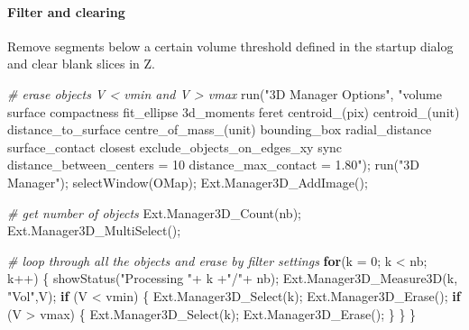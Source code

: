 \documentclass[10pt, b5paper, singlespacinge, twoside]{reedthesis} %
\newenvironment{Shaded}{}{}
\newcommand{\AttributeTok}[1]{#1}
\newcommand{\CommentTok}[1]{\textit{#1}}
\newcommand{\ControlFlowTok}[1]{\textbf{#1}}
\newcommand{\DecValTok}[1]{#1}
\newcommand{\FunctionTok}[1]{#1}
\newcommand{\NormalTok}[1]{#1}
\newcommand{\SpecialCharTok}[1]{#1}
\newcommand{\StringTok}[1]{#1}
\theoremstyle{definition}
\theoremstyle{definition}
\theoremstyle{definition}
\theoremstyle{remark}
\begin{document}
\hypertarget{filter-and-clearing}{%
\paragraph{Filter and clearing}\label{filter-and-clearing}}

Remove segments below a certain volume threshold defined in the startup dialog and clear blank slices in Z.

\scriptsize
\begin{Shaded}
\begin{Highlighting}[numbers=left,,]
\CommentTok{\# erase objects V \textless{} vmin and V \textgreater{} vmax}
  \FunctionTok{run}\NormalTok{(}\StringTok{"3D Manager Options"}\NormalTok{, }\StringTok{"volume surface compactness fit\_ellipse 3d\_moments }
\StringTok{      feret centroid\_(pix) centroid\_(unit) distance\_to\_surface centre\_of\_mass\_(unit) }
\StringTok{      bounding\_box radial\_distance surface\_contact closest exclude\_objects\_on\_edges\_xy }
\StringTok{      sync distance\_between\_centers = 10 distance\_max\_contact = 1.80"}\NormalTok{);}
    \FunctionTok{run}\NormalTok{(}\StringTok{"3D Manager"}\NormalTok{);}
  \FunctionTok{selectWindow}\NormalTok{(OMap);}
    \FunctionTok{Ext.Manager3D\_AddImage}\NormalTok{();}

\CommentTok{\# get number of objects}
    \FunctionTok{Ext.Manager3D\_Count}\NormalTok{(nb);}
    \FunctionTok{Ext.Manager3D\_MultiSelect}\NormalTok{();}

\CommentTok{\# loop through all the objects and erase by filter settings}
    \ControlFlowTok{for}\NormalTok{(}\AttributeTok{k =} \DecValTok{0}\NormalTok{; k }\SpecialCharTok{\textless{}}\NormalTok{ nb; k}\SpecialCharTok{++}\NormalTok{) \{}
        \FunctionTok{showStatus}\NormalTok{(}\StringTok{"Processing "}\SpecialCharTok{+}\NormalTok{ k }\SpecialCharTok{+}\StringTok{"/"}\SpecialCharTok{+}\NormalTok{ nb);}
        \FunctionTok{Ext.Manager3D\_Measure3D}\NormalTok{(k, }\StringTok{"Vol"}\NormalTok{,V);}
        \ControlFlowTok{if}\NormalTok{ (V }\SpecialCharTok{\textless{}}\NormalTok{ vmin) \{}
            \FunctionTok{Ext.Manager3D\_Select}\NormalTok{(k);}
            \FunctionTok{Ext.Manager3D\_Erase}\NormalTok{();}
            \ControlFlowTok{if}\NormalTok{ (V }\SpecialCharTok{\textgreater{}}\NormalTok{ vmax) \{}
                \FunctionTok{Ext.Manager3D\_Select}\NormalTok{(k);}
                \FunctionTok{Ext.Manager3D\_Erase}\NormalTok{();}
\NormalTok{            \}}
\NormalTok{        \}}
\NormalTok{    \}}


\end{Highlighting}
\end{Shaded}
\end{document}
